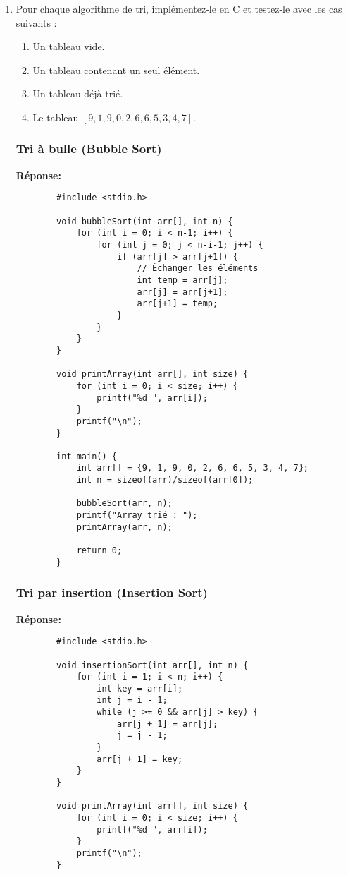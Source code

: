 \begin{enumerate}
	\item Pour chaque algorithme de tri, implémentez-le en C et testez-le avec les cas suivants :
	\begin{enumerate}
		\item Un tableau vide.
		\item Un tableau contenant un seul élément.
		\item Un tableau déjà trié.
		\item Le tableau \([9, 1, 9, 0, 2, 6, 6, 5, 3, 4, 7]\).
	\end{enumerate}
	
	\subsubsection{Tri à bulle (Bubble Sort)}
	
	\textbf{Réponse:}
	\begin{lstlisting}
		#include <stdio.h>
		
		void bubbleSort(int arr[], int n) {
			for (int i = 0; i < n-1; i++) {
				for (int j = 0; j < n-i-1; j++) {
					if (arr[j] > arr[j+1]) {
						// Échanger les éléments
						int temp = arr[j];
						arr[j] = arr[j+1];
						arr[j+1] = temp;
					}
				}
			}
		}
		
		void printArray(int arr[], int size) {
			for (int i = 0; i < size; i++) {
				printf("%d ", arr[i]);
			}
			printf("\n");
		}
		
		int main() {
			int arr[] = {9, 1, 9, 0, 2, 6, 6, 5, 3, 4, 7};
			int n = sizeof(arr)/sizeof(arr[0]);
			
			bubbleSort(arr, n);
			printf("Array trié : ");
			printArray(arr, n);
			
			return 0;
		}
	\end{lstlisting}
	
	\subsubsection{Tri par insertion (Insertion Sort)}
	
	\textbf{Réponse:}
	\begin{lstlisting}
		#include <stdio.h>
		
		void insertionSort(int arr[], int n) {
			for (int i = 1; i < n; i++) {
				int key = arr[i];
				int j = i - 1;
				while (j >= 0 && arr[j] > key) {
					arr[j + 1] = arr[j];
					j = j - 1;
				}
				arr[j + 1] = key;
			}
		}
		
		void printArray(int arr[], int size) {
			for (int i = 0; i < size; i++) {
				printf("%d ", arr[i]);
			}
			printf("\n");
		}
		

\end{lstlisting}
\end{enumerate}
